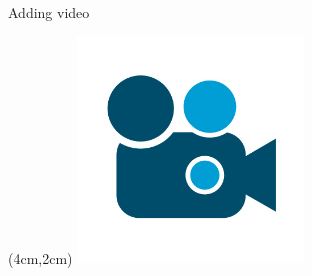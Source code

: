 \documentclass[aspectratio=169,xcolor=table]{beamer}
\begin{document}
\begin{frame}{Adding video}
	
	\begin{textblock*}{4cm}(4cm,2cm) %
	\href{run:images/video.mp4?autostart&loop}{\includegraphics[width=6cm,height=6cm]{video.jpg}}
	\end{textblock*}

\end{frame}
\end{document}
